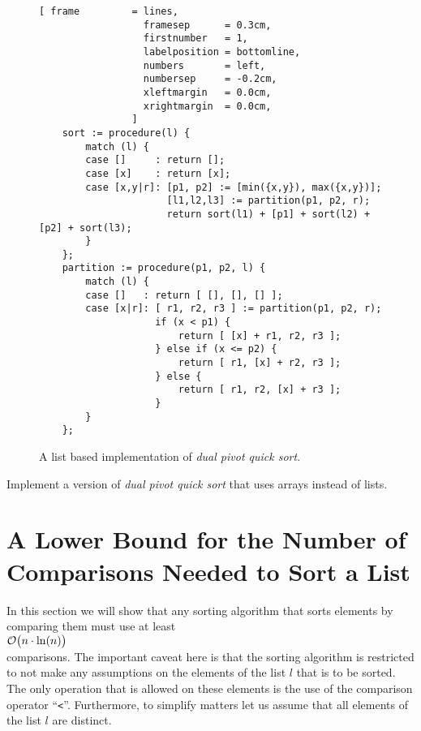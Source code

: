 \begin{figure}[!ht]
\centering
\begin{Verbatim}[ frame         = lines, 
                  framesep      = 0.3cm, 
                  firstnumber   = 1,
                  labelposition = bottomline,
                  numbers       = left,
                  numbersep     = -0.2cm,
                  xleftmargin   = 0.0cm,
                  xrightmargin  = 0.0cm,
                ]
    sort := procedure(l) {
        match (l) {
        case []     : return [];
        case [x]    : return [x];
        case [x,y|r]: [p1, p2] := [min({x,y}), max({x,y})];
                      [l1,l2,l3] := partition(p1, p2, r);
                      return sort(l1) + [p1] + sort(l2) + [p2] + sort(l3);
        }
    };
    partition := procedure(p1, p2, l) {
        match (l) {
        case []   : return [ [], [], [] ];
        case [x|r]: [ r1, r2, r3 ] := partition(p1, p2, r);
                    if (x < p1) {
                        return [ [x] + r1, r2, r3 ];
                    } else if (x <= p2) {
                        return [ r1, [x] + r2, r3 ];
                    } else {
                        return [ r1, r2, [x] + r3 ];
                    }
        }
    };
\end{Verbatim}
\vspace*{-0.3cm}
\caption{A list based implementation of \emph{dual pivot quick sort}.}
\label{fig:dual-pivot-quick-sort.stlx}
\end{figure}

\exercise
Implement a version of \emph{dual pivot quick sort} that uses arrays instead of lists.


\section[A Lower Bound]{A Lower Bound for the Number of Comparisons Needed to Sort a List}
In this section we will show that any sorting algorithm that sorts elements by comparing them must
use at least 
\\[0.2cm]
\hspace*{1.3cm}
 $\mathcal{O}\bigl(n \cdot \ln(n)\bigr)$ 
\\[0.2cm]
comparisons.  The important caveat here is that the sorting algorithm is restricted to not make any assumptions
on the elements of the list $l$ that is to be sorted.  The only operation that is allowed on these
elements is the use of the comparison operator ``\texttt{<}''.  Furthermore, to simplify matters let
us assume that all elements of the list $l$ are distinct.

